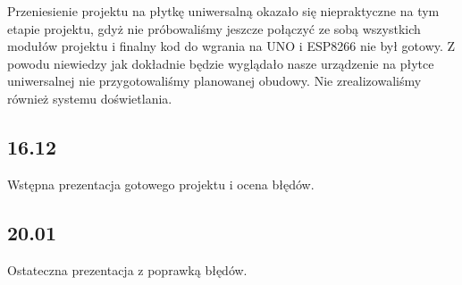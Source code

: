 \documentclass[12pt]{article}
\begin{document}
Przeniesienie projektu na płytkę uniwersalną okazało się niepraktyczne na tym etapie projektu, gdyż nie próbowaliśmy jeszcze połączyć ze sobą wszystkich modułów projektu i finalny kod do wgrania na UNO i ESP8266 nie był gotowy. Z powodu niewiedzy jak dokładnie będzie wyglądało nasze urządzenie na płytce uniwersalnej nie przygotowaliśmy planowanej obudowy. Nie zrealizowaliśmy również systemu doświetlania.

\subsection{16.12}
Wstępna prezentacja gotowego projektu i ocena błędów.

\subsection{20.01}
Ostateczna prezentacja z poprawką błędów.
\end{document}
